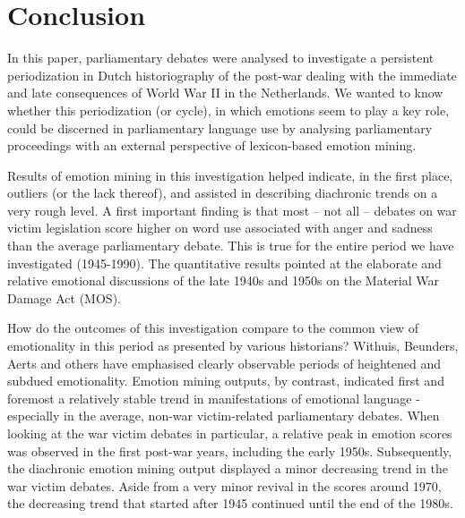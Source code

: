 \documentclass{dhbenelux}
\begin{document}
\section{Conclusion} 
In this paper, parliamentary debates were analysed to investigate a persistent periodization in Dutch historiography of the post-war dealing with the immediate and late consequences of World War II in the Netherlands. We wanted to know whether this periodization (or cycle), in which emotions seem to play a key role, could be discerned in parliamentary language use by analysing parliamentary proceedings with an external perspective of lexicon-based emotion mining.

Results of emotion mining in this investigation helped indicate, in the first place, outliers (or the lack thereof), and assisted in describing diachronic trends on a very rough level. A first important finding is that most – not all – debates on war victim legislation score higher on word use associated with anger and sadness than the average parliamentary debate. This is true for the entire period we have investigated (1945-1990). The quantitative results pointed at the elaborate and relative emotional discussions of the late 1940s and 1950s on the Material War Damage Act (MOS). 

How do the outcomes of this investigation compare to the common view of emotionality in this period as presented by various historians? Withuis, Beunders, Aerts and others have emphasised clearly observable periods of heightened and subdued emotionality. Emotion mining outputs, by contrast, indicated first and foremost a relatively stable trend in manifestations of emotional language - especially in the average, non-war victim-related parliamentary debates. When looking at the war victim debates in particular, a relative peak in emotion scores was observed in the first post-war years, including the early 1950s. Subsequently, the diachronic emotion mining output displayed a minor decreasing trend in the war victim debates. Aside from a very minor revival in the scores around 1970, the decreasing trend that started after 1945 continued until the end of the 1980s. 
\end{document}
